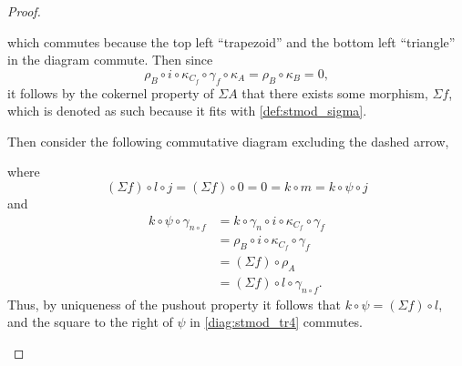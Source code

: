 \begin{proof}
\begin{enumerate}[label={(\bfseries TR\arabic*)}]
{\begin{center}
            \end{center}
            which commutes because the top left ``trapezoid'' and the bottom left ``triangle'' in the diagram commute. Then since
            \[
                \rho_B \circ i \circ \kappa_{C_f} \circ \gamma_f \circ \kappa_A = \rho_B \circ \kappa_B = 0,
            \]
            it follows by the cokernel property of \( \Sigma A \) that there exists some morphism, \( \Sigma f \), which is denoted as such because it fits with \autoref{def:stmod_sigma}.

            Then consider the following commutative diagram excluding the dashed arrow,
            \begin{center}
            \end{center}
            where
            \[
                (\Sigma f) \circ l \circ j = (\Sigma f) \circ 0 = 0 = k \circ m = k \circ \psi \circ j
            \]
            and
            \begin{align*}
                k \circ \psi \circ \gamma_{n \circ f} &= k \circ \gamma_n \circ i \circ \kappa_{C_f} \circ \gamma_f \\
                &= \rho_B \circ i \circ \kappa_{C_f} \circ \gamma_f \\
                &= (\Sigma f) \circ \rho_A \\
                &= (\Sigma f) \circ l \circ \gamma_{n \circ f}.
            \end{align*}
            Thus, by uniqueness of the pushout property it follows that \( k \circ \psi = (\Sigma f) \circ l \), and the square to the right of \( \psi \) in \autoref{diag:stmod_tr4} commutes.

}
\end{enumerate}
\end{proof}
